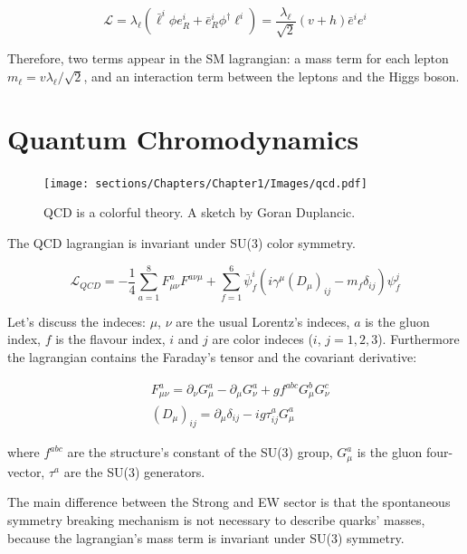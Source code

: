 \begin{equation}
    \mathcal{L} = \lambda_{\ell}(\bar{\ell}^i \phi e^i_R + \bar{e}^i_R \phi^{\dagger} \ell^i) = 
    \frac{\lambda_{\ell}}{\sqrt{2}}(v + h) \bar{e}^i e^i
\end{equation}

Therefore, two terms appear in the SM lagrangian: a mass term for each lepton $m_{\ell} = v \lambda_{\ell} / \sqrt{2}$,
and an interaction term between the leptons and the Higgs boson.

\section{Quantum Chromodynamics}

\begin{figure}[h]
    \centering
    \texttt{[image: sections/Chapters/Chapter1/Images/qcd.pdf]}
    \caption{QCD is a colorful theory. A sketch by Goran Duplancic.}
\end{figure}

The QCD lagrangian is invariant under SU(3) color symmetry.

\begin{equation}
    \mathcal{L}_{QCD} = - \frac{1}{4} \sum_{a=1}^{8} F^a_{\mu \nu}F^{a \nu \mu} + \sum_{f=1}^{6} \overbar{\psi}_f^i
    (i \gamma^{\mu} (D_{\mu})_{ij} - m_f \delta_{ij}) \psi_f^j
\end{equation}


Let's discuss the indeces: $\mu$, $\nu$ are the usual Lorentz's indeces, $a$ is the gluon index, $f$ is the
flavour index, $i$ and $j$ are color indeces ($i$, $j = 1, 2, 3$).
Furthermore the lagrangian contains the Faraday's tensor and the covariant derivative:

\begin{align}
    &F^a_{\mu \nu} = \partial_{\nu} G^a_{\mu} - \partial_{\mu} G^a_{\nu} + g f^{abc}G_{\mu}^{b}G^c_{\nu} \\
    &(D_{\mu})_{ij} = \partial_{\mu} \delta_{ij} - i g \tau^a_{ij} G^a_{\mu}
\end{align}

where $f^{abc}$ are the structure's constant of the SU(3) group, $G^a_{\mu}$ is the gluon four-vector, 
$\tau^a$ are the SU(3) generators.

The main difference between the Strong and EW sector is that the spontaneous symmetry breaking 
mechanism is not necessary to describe quarks' masses, because the lagrangian's mass term is invariant 
under SU(3) symmetry.

